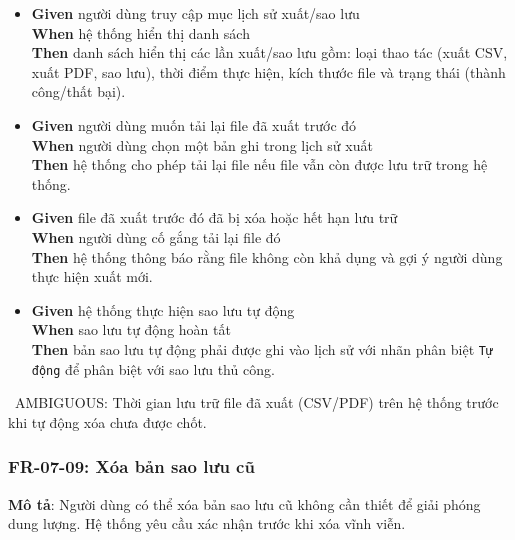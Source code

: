 \begin{itemize}
\item \textbf{Given} người dùng truy cập mục lịch sử xuất/sao lưu  \\ \hspace*{1.5em}  \textbf{When} hệ thống hiển thị danh sách  \\ \hspace*{1.5em}  \textbf{Then} danh sách hiển thị các lần xuất/sao lưu gồm: loại thao tác (xuất CSV, xuất PDF, sao lưu), thời điểm thực hiện, kích thước file và trạng thái (thành công/thất bại).
\item \textbf{Given} người dùng muốn tải lại file đã xuất trước đó  \\ \hspace*{1.5em}  \textbf{When} người dùng chọn một bản ghi trong lịch sử xuất  \\ \hspace*{1.5em}  \textbf{Then} hệ thống cho phép tải lại file nếu file vẫn còn được lưu trữ trong hệ thống.
\item \textbf{Given} file đã xuất trước đó đã bị xóa hoặc hết hạn lưu trữ  \\ \hspace*{1.5em}  \textbf{When} người dùng cố gắng tải lại file đó  \\ \hspace*{1.5em}  \textbf{Then} hệ thống thông báo rằng file không còn khả dụng và gợi ý người dùng thực hiện xuất mới.
\item \textbf{Given} hệ thống thực hiện sao lưu tự động  \\ \hspace*{1.5em}  \textbf{When} sao lưu tự động hoàn tất  \\ \hspace*{1.5em}  \textbf{Then} bản sao lưu tự động phải được ghi vào lịch sử với nhãn phân biệt \texttt{Tự động} để phân biệt với sao lưu thủ công.
\end{itemize}
\warningicon\  AMBIGUOUS: Thời gian lưu trữ file đã xuất (CSV/PDF) trên hệ thống trước khi tự động xóa chưa được chốt.



\subsubsection{FR-07-09: Xóa bản sao lưu cũ}

\textbf{Mô tả}: Người dùng có thể xóa bản sao lưu cũ không cần thiết để giải phóng dung lượng. Hệ thống yêu cầu xác nhận trước khi xóa vĩnh viễn.



